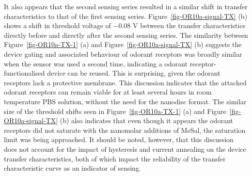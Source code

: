 \documentclass[
  a4paper,
]{scrbook}
\begin{document}
It also appears that the second sensing series resulted in a similar
shift in transfer characteristics to that of the first sensing series.
Figure~\ref{fig-OR10a-signal-TX} (b) shows a shift in threshold voltage
of \(-0.08\) V between the transfer characteristics directly before and
directly after the second sensing series. The similarity between
Figure~\ref{fig-OR10a-TX-1} (a) and Figure~\ref{fig-OR10a-signal-TX} (b)
suggests the device gating and associated behaviour of odorant receptors
was broadly similar when the sensor was used a second time, indicating a
odorant receptor-functionalised device can be reused. This is
surprising, given the odorant receptors lack a protective membrane. This
discussion indicates that the attached odorant receptors can remain
viable for at least several hours in room temperature PBS solution,
without the need for the nanodisc format. The similar size of the
threshold shifts seen in Figure~\ref{fig-OR10a-TX-1} (a) and
Figure~\ref{fig-OR10a-signal-TX} (b) also indicates that even though it
appears the odorant receptors did not saturate with the nanomolar
additions of MeSal, the saturation limit was being approached. It should
be noted, however, that this discussion does not account for the impact
of hysteresis and current annealing on the device transfer
characteristics, both of which impact the reliability of the transfer
characteristic curve as an indicator of sensing.
\end{document}
